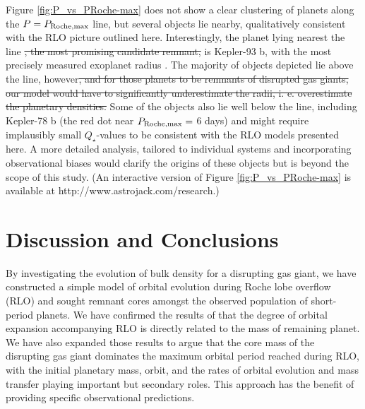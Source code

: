 \documentclass{svjour3}                     %
\providecommand{\DIFadd}[1]{{\protect\color{blue}\uwave{#1}}} %
\providecommand{\DIFdel}[1]{{\protect\color{red}\sout{#1}}}                      %
\providecommand{\DIFaddbegin}{} %
\providecommand{\DIFaddend}{} %
\providecommand{\DIFdelbegin}{} %
\providecommand{\DIFdelend}{} %
\begin{document}
Figure \ref{fig:P_vs_PRoche-max} does not show a clear clustering of planets along the $P = P_{\rm Roche, max}$ line, but several objects lie nearby, qualitatively consistent with the RLO picture outlined here. Interestingly, the planet lying nearest the line \DIFdelbegin \DIFdel{, the most promising candidate remnant, }\DIFdelend is Kepler-93 b, with the most precisely measured exoplanet radius \cite{2014ApJ...790...12B}. The majority of objects depicted lie above the line, however\DIFdelbegin \DIFdel{, and for those planets to be remnants of disrupted gas giants, our model would have to significantly underestimate the radii, i. e. overestimate the planetary densities. }\DIFdelend \DIFaddbegin \DIFadd{. }\DIFaddend Some of the objects also lie well below the line, including Kepler-78 b (the red dot near $P_{\rm Roche, max} =$ 6 days) and might require implausibly small $Q_\star$-values to be consistent with the RLO models presented here. A more detailed analysis, tailored to individual systems and incorporating observational biases would clarify the origins of these objects but is beyond the scope of this study. (An interactive version of Figure \ref{fig:P_vs_PRoche-max} is available at http://www.astrojack.com/research.)

\section{Discussion and Conclusions}
\label{sec:Discussion_and_Conclusions}
By investigating the evolution of bulk density for a disrupting gas giant, we have constructed a simple model of orbital evolution during Roche lobe overflow (RLO) and sought remnant cores amongst the observed population of short-period planets. We have confirmed the results of \cite{2015ApJ...813..101V} that the degree of orbital expansion accompanying RLO is directly related to the mass of remaining planet. We have also expanded those results to argue that the core mass of the disrupting gas giant dominates the maximum orbital period reached during RLO, with the initial planetary mass, orbit, and the rates of orbital evolution and mass transfer playing important but secondary roles. This approach has the benefit of providing specific observational predictions.
\end{document}
